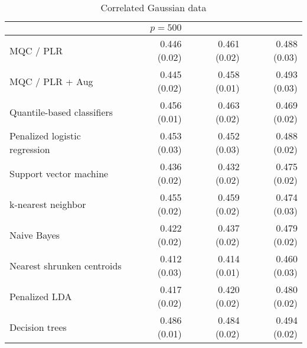 \begin{table}[p]
\begin{adjustbox}{max size={\textwidth}{10cm}}
\begin{tabular}{l@{\extracolsep{15mm}}rrr}
      \hline
      & $p = 500$ \\
      \hline

      MQC / PLR & 0.446 (0.02) & 0.461 (0.02) & 0.488 (0.03) \\ 
      MQC / PLR + Aug & 0.445 (0.02) & 0.458 (0.01) & 0.493 (0.03) \\ 
      Quantile-based classifiers & 0.456 (0.01) & 0.463 (0.02) & 0.469 (0.02) \\ 
      Penalized logistic regression & 0.453 (0.03) & 0.452 (0.03) & 0.488 (0.02) \\ 
      Support vector machine & 0.436 (0.02) & 0.432 (0.02) & 0.475 (0.02) \\ 
      k-nearest neighbor & 0.455 (0.02) & 0.459 (0.02) & 0.474 (0.03) \\ 
      Naive Bayes & 0.422 (0.02) & 0.437 (0.02) & 0.479 (0.02) \\ 
      Nearest shrunken centroids & 0.412 (0.03) & 0.414 (0.01) & 0.460 (0.03) \\ 
      Penalized LDA & 0.417 (0.02) & 0.420 (0.02) & 0.480 (0.02) \\ 
      Decision trees & 0.486 (0.01) & 0.484 (0.02) & 0.494 (0.02) \\
      
      \hline
      
    \end{tabular}
  \end{adjustbox}
  \caption{Correlated Gaussian data}
\end{table}



